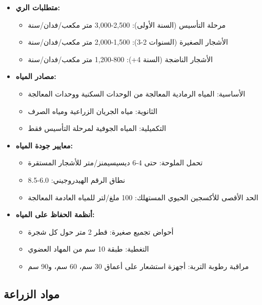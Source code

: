 \begin{itemize}
    \item \textbf{متطلبات الري:}
    \begin{itemize}
        \item مرحلة التأسيس (السنة الأولى): 2,500-3,000 متر مكعب/فدان/سنة
        \item الأشجار الصغيرة (السنوات 2-3): 1,500-2,000 متر مكعب/فدان/سنة
        \item الأشجار الناضجة (السنة 4+): 800-1,200 متر مكعب/فدان/سنة
    \end{itemize}
    \item \textbf{مصادر المياه:}
    \begin{itemize}
        \item الأساسية: المياه الرمادية المعالجة من الوحدات السكنية ووحدات المعالجة
        \item الثانوية: مياه الجريان الزراعية ومياه الصرف
        \item التكميلية: المياه الجوفية لمرحلة التأسيس فقط
    \end{itemize}
    \item \textbf{معايير جودة المياه:}
    \begin{itemize}
        \item تحمل الملوحة: حتى 4-6 ديسيسيمنز/متر للأشجار المستقرة
        \item نطاق الرقم الهيدروجيني: 6.0-8.5
        \item الحد الأقصى للأكسجين الحيوي المستهلك: 100 ملغ/لتر للمياه العادمة المعالجة
    \end{itemize}
    \item \textbf{أنظمة الحفاظ على المياه:}
    \begin{itemize}
        \item أحواض تجميع صغيرة: قطر 2 متر حول كل شجرة
        \item التغطية: طبقة 10 سم من المهاد العضوي
        \item مراقبة رطوبة التربة: أجهزة استشعار على أعماق 30 سم، 60 سم، و90 سم
    \end{itemize}
\end{itemize}

\subsection{مواد الزراعة}

